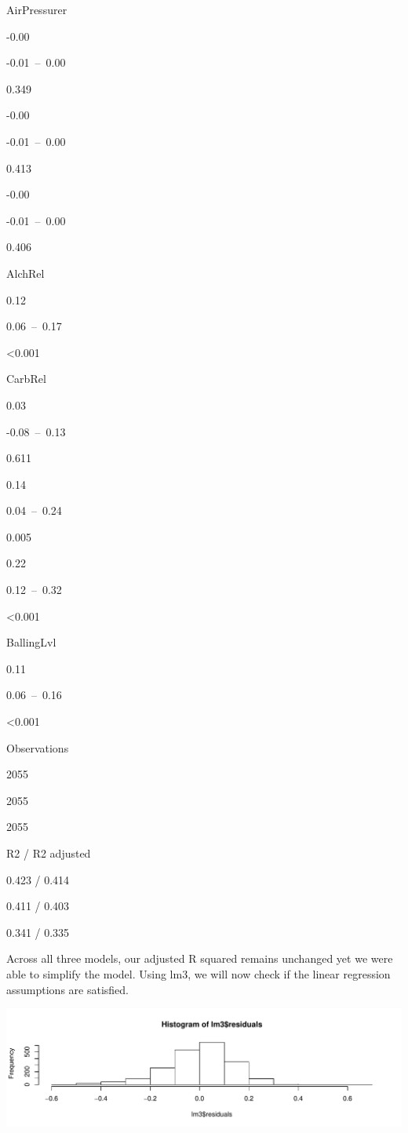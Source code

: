 \documentclass[]{report}
\newenvironment{Shaded}{\begin{snugshade}}{\end{snugshade}}
\newcommand{\KeywordTok}[1]{\textcolor[rgb]{0.13,0.29,0.53}{\textbf{#1}}}
\newcommand{\NormalTok}[1]{#1}
\newcommand{\OperatorTok}[1]{\textcolor[rgb]{0.81,0.36,0.00}{\textbf{#1}}}
\begin{document}
AirPressurer

-0.00

-0.01~--~0.00

0.349

-0.00

-0.01~--~0.00

0.413

-0.00

-0.01~--~0.00

0.406

AlchRel

0.12

0.06~--~0.17

\textless0.001

CarbRel

0.03

-0.08~--~0.13

0.611

0.14

0.04~--~0.24

0.005

0.22

0.12~--~0.32

\textless0.001

BallingLvl

0.11

0.06~--~0.16

\textless0.001

Observations

2055

2055

2055

R2 / R2 adjusted

0.423 / 0.414

0.411 / 0.403

0.341 / 0.335

Across all three models, our adjusted R squared remains unchanged yet we
were able to simplify the model. Using lm3, we will now check if the
linear regression assumptions are satisfied.

\begin{Shaded}
\end{Shaded}

\includegraphics{Project2-VH_files/figure-latex/project2a12-1.pdf}
\end{document}
